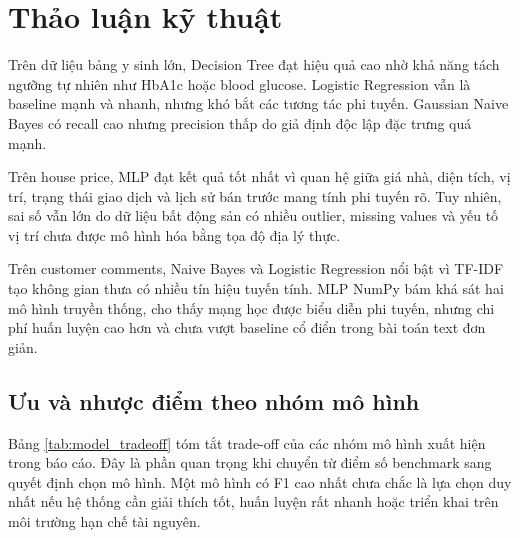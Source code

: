 \documentclass[12pt,a4paper]{report}
\begin{document}
\section{Thảo luận kỹ thuật}
Trên dữ liệu bảng y sinh lớn, Decision Tree đạt hiệu quả cao nhờ khả năng tách ngưỡng tự nhiên như HbA1c hoặc blood glucose. Logistic Regression vẫn là baseline mạnh và nhanh, nhưng khó bắt các tương tác phi tuyến. Gaussian Naive Bayes có recall cao nhưng precision thấp do giả định độc lập đặc trưng quá mạnh.

Trên house price, MLP đạt kết quả tốt nhất vì quan hệ giữa giá nhà, diện tích, vị trí, trạng thái giao dịch và lịch sử bán trước mang tính phi tuyến rõ. Tuy nhiên, sai số vẫn lớn do dữ liệu bất động sản có nhiều outlier, missing values và yếu tố vị trí chưa được mô hình hóa bằng tọa độ địa lý thực.

Trên customer comments, Naive Bayes và Logistic Regression nổi bật vì TF-IDF tạo không gian thưa có nhiều tín hiệu tuyến tính. MLP NumPy bám khá sát hai mô hình truyền thống, cho thấy mạng học được biểu diễn phi tuyến, nhưng chi phí huấn luyện cao hơn và chưa vượt baseline cổ điển trong bài toán text đơn giản.

\subsection{Ưu và nhược điểm theo nhóm mô hình}
Bảng \ref{tab:model_tradeoff} tóm tắt trade-off của các nhóm mô hình xuất hiện trong báo cáo.
Đây là phần quan trọng khi chuyển từ điểm số benchmark sang quyết định chọn mô hình.
Một mô hình có F1 cao nhất chưa chắc là lựa chọn duy nhất nếu hệ thống cần giải thích tốt, huấn luyện rất nhanh hoặc triển khai trên môi trường hạn chế tài nguyên.

\begin{table}[H]
\centering
\caption{Ưu và nhược điểm của các nhóm mô hình trong Assignment 03}
\label{tab:model_tradeoff}
\end{table}
\end{document}
